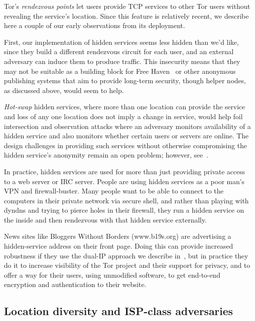 \documentclass{llncs}
\begin{document}

Tor's \emph{rendezvous points}
let users provide TCP services to other Tor users without revealing
the service's location. Since this feature is relatively recent, we describe
here
a couple of our early observations from its deployment.

First, our implementation of hidden services seems less hidden than we'd
like, since they build a different rendezvous circuit for each user,
and an external adversary can induce them to
produce traffic. This insecurity means that they may not be suitable as
a building block for Free Haven~\cite{freehaven-berk} or other anonymous
publishing systems that aim to provide long-term security, though helper
nodes, as discussed above, would seem to help.

\emph{Hot-swap} hidden services, where more than one location can
provide the service and loss of any one location does not imply a
change in service, would help foil intersection and observation attacks
where an adversary monitors availability of a hidden service and also
monitors whether certain users or servers are online. The design
challenges in providing such services without otherwise compromising
the hidden service's anonymity remain an open problem;
however, see~\cite{move-ndss05}.

In practice, hidden services are used for more than just providing private
access to a web server or IRC server. People are using hidden services
as a poor man's VPN and firewall-buster. Many people want to be able
to connect to the computers in their private network via secure shell,
and rather than playing with dyndns and trying to pierce holes in their
firewall, they run a hidden service on the inside and then rendezvous
with that hidden service externally.

News sites like Bloggers Without Borders (www.b19s.org) are advertising
a hidden-service address on their front page. Doing this can provide
increased robustness if they use the dual-IP approach we describe
in~\cite{tor-design},
but in practice they do it to increase visibility
of the Tor project and their support for privacy, and to offer
a way for their users, using unmodified software, to get end-to-end
encryption and authentication to their website.

\subsection{Location diversity and ISP-class adversaries}
\label{subsec:routing-zones}
\end{document}

